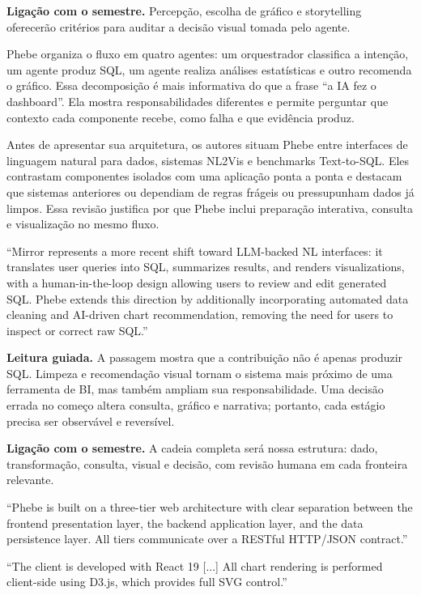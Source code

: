 \noindent\textbf{Ligação com o semestre.} Percepção, escolha de gráfico e storytelling oferecerão critérios para auditar a decisão visual tomada pelo agente.

Phebe organiza o fluxo em quatro agentes: um orquestrador classifica a intenção, um agente produz SQL, um agente realiza análises estatísticas e outro recomenda o gráfico. Essa decomposição é mais informativa do que a frase ``a IA fez o dashboard''. Ela mostra responsabilidades diferentes e permite perguntar que contexto cada componente recebe, como falha e que evidência produz.

Antes de apresentar sua arquitetura, os autores situam Phebe entre interfaces de linguagem natural para dados, sistemas NL2Vis e benchmarks Text-to-SQL. Eles contrastam componentes isolados com uma aplicação ponta a ponta e destacam que sistemas anteriores ou dependiam de regras frágeis ou pressupunham dados já limpos. Essa revisão justifica por que Phebe inclui preparação interativa, consulta e visualização no mesmo fluxo.

\begin{ArticleBox}
``Mirror represents a more recent shift toward LLM-backed NL interfaces: it translates user queries into SQL, summarizes results, and renders visualizations, with a human-in-the-loop design allowing users to review and edit generated SQL. Phebe extends this direction by additionally incorporating automated data cleaning and AI-driven chart recommendation, removing the need for users to inspect or correct raw SQL.''
\end{ArticleBox}

\noindent\textbf{Leitura guiada.} A passagem mostra que a contribuição não é apenas produzir SQL. Limpeza e recomendação visual tornam o sistema mais próximo de uma ferramenta de BI, mas também ampliam sua responsabilidade. Uma decisão errada no começo altera consulta, gráfico e narrativa; portanto, cada estágio precisa ser observável e reversível.

\noindent\textbf{Ligação com o semestre.} A cadeia completa será nossa estrutura: dado, transformação, consulta, visual e decisão, com revisão humana em cada fronteira relevante.

\begin{ArticleBox}
``Phebe is built on a three-tier web architecture with clear separation between the frontend presentation layer, the backend application layer, and the data persistence layer. All tiers communicate over a RESTful HTTP/JSON contract.''

``The client is developed with React 19 [...] All chart rendering is performed client-side using D3.js, which provides full SVG control.''
\end{ArticleBox}

